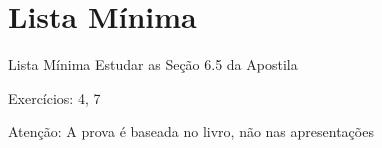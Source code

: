 \documentclass[fleqn,utf8,aspectratio=169,12pt]{beamer}
\begin{document}

\section{Lista Mínima}

\begin{frame}{Lista Mínima}
  Estudar as Seção 6.5 da Apostila

  \vspace{\baselineskip}
  Exercícios: 4, 7

  \vfill
  Atenção: A prova é baseada no livro, não nas apresentações
\end{frame}

\end{document}
